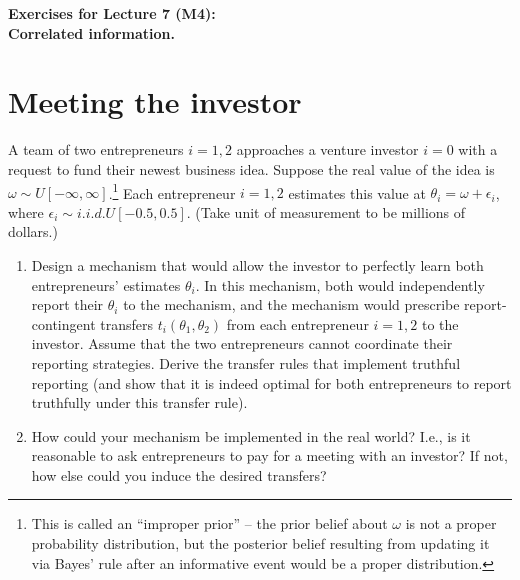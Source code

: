 \documentclass[a4paper]{article}
\newif\ifsolutions
\begin{document}
\begin{center}
		\LARGE\textbf{Exercises for Lecture 7 (M4):\\ Correlated information.}
\end{center}



\section{Meeting the investor}
	A team of two entrepreneurs $i=1,2$ approaches a venture investor $i=0$ with a request to fund their newest business idea. Suppose the real value of the idea is $\omega \sim U[-\infty, \infty]$.\footnote{This is called an ``improper prior'' -- the prior belief about $\omega$ is not a proper probability distribution, but the posterior belief resulting from updating it via Bayes' rule after an informative event would be a proper distribution.}
	Each entrepreneur $i=1,2$ estimates this value at $\theta_i = \omega + \epsilon_i$, where $\epsilon_i \sim i.i.d.U[-0.5,0.5]$. (Take unit of measurement to be millions of dollars.)
	
	\begin{enumerate}
		\item Design a mechanism that would allow the investor to perfectly learn both entrepreneurs' estimates $\theta_i$. In this mechanism, both would independently report their $\theta_i$ to the mechanism, and the mechanism would prescribe report-contingent transfers $t_i(\theta_1,\theta_2)$ from each entrepreneur $i=1,2$ to the investor. Assume that the two entrepreneurs cannot coordinate their reporting strategies. Derive the transfer rules that implement truthful reporting (and show that it is indeed optimal for both entrepreneurs to report truthfully under this transfer rule).
		
		\item How could your mechanism be implemented in the real world? I.e., is it reasonable to ask entrepreneurs to pay for a meeting with an investor? If not, how else could you induce the desired transfers?
	\end{enumerate}

\ifsolutions
\end{document}
